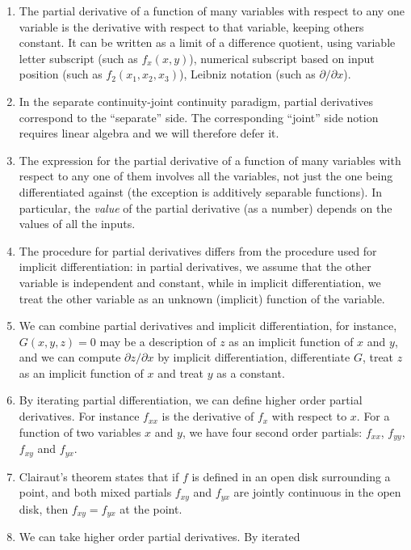 \documentclass[10pt]{amsart}
\begin{document}
\begin{enumerate}
\item The partial derivative of a function of many variables with
  respect to any one variable is the derivative with respect to that
  variable, keeping others constant. It can be written as a limit of a
  difference quotient, using variable letter subscript (such as
  $f_x(x,y)$), numerical subscript based on input position (such as
  $f_2(x_1,x_2,x_3)$), Leibniz notation (such as $\partial/\partial x$).
\item In the separate continuity-joint continuity paradigm, partial
  derivatives correspond to the ``separate'' side. The corresponding
  ``joint'' side notion requires linear algebra and we will therefore
  defer it.
\item The expression for the partial derivative of a function of many
  variables with respect to any one of them involves all the
  variables, not just the one being differentiated against (the
  exception is additively separable functions). In particular, the
  {\em value} of the partial derivative (as a number) depends on the
  values of all the inputs.
\item The procedure for partial derivatives differs from the procedure
  used for implicit differentiation: in partial derivatives, we assume
  that the other variable is independent and constant, while in
  implicit differentiation, we treat the other variable as an unknown
  (implicit) function of the variable.
\item We can combine partial derivatives and implicit differentiation,
  for instance, $G(x,y,z) = 0$ may be a description of $z$ as an
  implicit function of $x$ and $y$, and we can compute $\partial
  z/\partial x$ by implicit differentiation, differentiate $G$, treat
  $z$ as an implicit function of $x$ and treat $y$ as a constant.
\item By iterating partial differentiation, we can define higher order
  partial derivatives. For instance $f_{xx}$ is the derivative of
  $f_x$ with respect to $x$. For a function of two variables $x$ and
  $y$, we have four second order partials: $f_{xx}$, $f_{yy}$,
  $f_{xy}$ and $f_{yx}$. 
\item Clairaut's theorem states that if $f$ is defined in an open disk
  surrounding a point, and both mixed partials $f_{xy}$ and $f_{yx}$
  are jointly continuous in the open disk, then $f_{xy} = f_{yx}$ at
  the point.
\item We can take higher order partial derivatives. By iterated

\end{enumerate}
\end{document}

